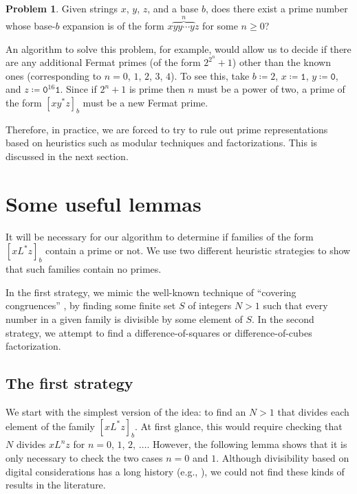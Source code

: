 \documentclass[12pt]{article}
\theoremstyle{plain}
\theoremstyle{definition}
\newtheorem{problem}[theorem]{Problem}
\newcommand{\0}{\mathtt{0}}
\newcommand{\1}{\mathtt{1}}
\newcommand{\2}{\mathtt{2}}
\newcommand{\3}{\mathtt{3}}
\newcommand{\4}{\mathtt{4}}
\newcommand{\5}{\mathtt{5}}
\newcommand{\6}{\mathtt{6}}
\newcommand{\7}{\mathtt{7}}
\newcommand{\8}{\mathtt{8}}
\newcommand{\9}{\mathtt{9}}
\begin{document}
\begin{problem}
Given strings $x$, $y$, $z$, and a base $b$, does there exist a prime
number whose base-$b$ expansion is of the form $x \overbrace{yy\cdots y}^n z$
for some $n \geq 0$?
\end{problem}

An algorithm to solve this problem, for example, would allow us to decide
if there are any additional Fermat primes (of the form $2^{2^n}+1$)
other than the known ones (corresponding to $n = 0$, $1$, $2$, $3$, $4$).
To see this, take $b\coloneqq2$, $x\coloneqq\1$, $y\coloneqq\0$, and $z\coloneqq\0^{16}\1$.
Since if $2^n+1$ is prime then $n$ must be a power of two, a prime of the
form $[xy^*z]_b$ must be a new Fermat prime.

Therefore, in practice, we are forced to try to rule out prime
representations based on heuristics such as
modular techniques and factorizations.
This is discussed in the next section.

\section{Some useful lemmas}\label{seclemmas}
It will be necessary for our algorithm to determine if families of the
form $[xL^*z]_b$ contain a prime or not.  We use two different 
heuristic strategies
to show that such families contain no primes.

In the first strategy, we mimic the well-known technique of ``covering
congruences'' \cite{Choi},
by finding some finite set $S$ of integers $N > 1$ such that
every number in a given family is divisible by some element of $S$.
In the second strategy, we attempt to find a
difference-of-squares or difference-of-cubes factorization.

\subsection{The first strategy}\label{subsecfirststrat}

We start with the simplest version of the idea:  to find 
an $N > 1$ that divides each element of the family $[xL^*z]_b$.
At first glance, this would require
checking that $N$ divides $xL^nz$ for $n=0$, $1$, $2$, $\dotsc$.
However, the following lemma shows that it is only necessary to check
the two cases $n=0$ and $1$.  Although divisibility based on digital
considerations has a long history (e.g., \cite[Chap.~XII]{Dick}),
we could not find these kinds of results in the literature.
\end{document}
